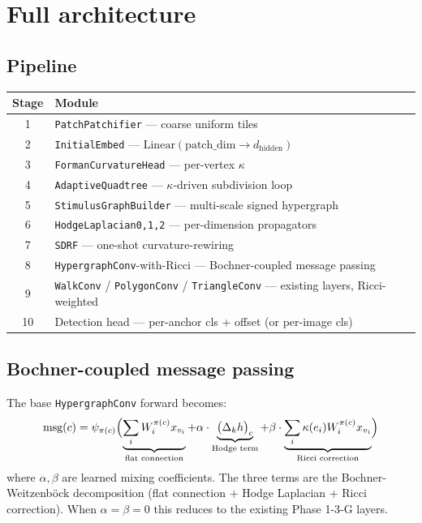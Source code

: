 \documentclass[11pt,a4paper]{article}
\begin{document}
\section{Full architecture}

\subsection{Pipeline}

\begin{center}
\begin{tabular}{cl}
\toprule
Stage & Module \\
\midrule
1 & \texttt{PatchPatchifier} --- coarse uniform tiles \\
2 & \texttt{InitialEmbed} --- $\mathrm{Linear}(\text{patch\_dim} \to d_\text{hidden})$ \\
3 & \texttt{FormanCurvatureHead} --- per-vertex $\kappa$ \\
4 & \texttt{AdaptiveQuadtree} --- $\kappa$-driven subdivision loop \\
5 & \texttt{StimulusGraphBuilder} --- multi-scale signed hypergraph \\
6 & \texttt{HodgeLaplacian0,1,2} --- per-dimension propagators \\
7 & \texttt{SDRF} --- one-shot curvature-rewiring \\
8 & \texttt{HypergraphConv}-with-Ricci --- Bochner-coupled message passing \\
9 & \texttt{WalkConv} / \texttt{PolygonConv} / \texttt{TriangleConv} --- existing layers, Ricci-weighted \\
10 & Detection head --- per-anchor cls + offset (or per-image cls) \\
\bottomrule
\end{tabular}
\end{center}

\subsection{Bochner-coupled message passing}

The base \texttt{HypergraphConv} forward becomes:
\[
\text{msg}(c) = \psi_{\pi(c)} \Bigl(
   \underbrace{\sum_i W_i^{\pi(c)} x_{v_i}}_{\text{flat connection}}
   + \alpha \cdot \underbrace{\bigl(\Delta_k h\bigr)_c}_{\text{Hodge term}}
   + \beta \cdot \underbrace{\sum_i \kappa(e_i) W_i^{\pi(c)} x_{v_i}}_{\text{Ricci correction}}
\Bigr)
\]
where $\alpha, \beta$ are learned mixing coefficients. The three
terms are the Bochner-Weitzenböck decomposition (flat connection +
Hodge Laplacian + Ricci correction). When $\alpha = \beta = 0$ this
reduces to the existing Phase 1-3-G layers.
\end{document}
